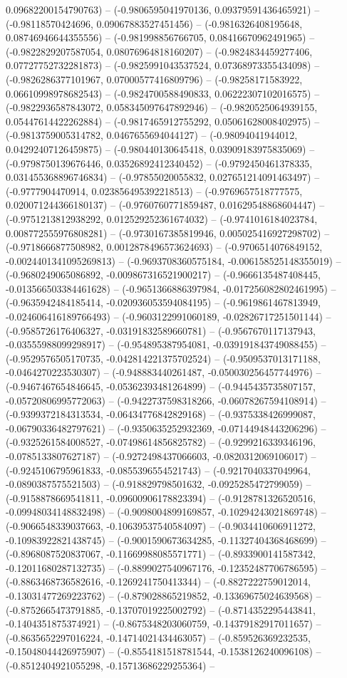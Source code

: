 0.09682200154790763) -- (-0.9806595041970136, 0.09379591436465921) -- (-0.98118570424696, 0.09067883527451456) -- (-0.9816326408195648, 0.08746946644355556) -- (-0.981998856766705, 0.08416670962491965) -- (-0.9822829207587054, 0.08076964818160207) -- (-0.9824834459277406, 0.07727752732281873) -- (-0.9825991043537524, 0.07368973355434098) -- (-0.9826286377101967, 0.07000577416809796) -- (-0.98258171583922, 0.06610998978682543) -- (-0.9824700588490833, 0.06222307102016575) -- (-0.9822936587843072, 0.058345097647892946) -- (-0.9820525064939155, 0.05447614422262884) -- (-0.9817465912755292, 0.05061628008402975) -- (-0.9813759005314782, 0.0467655694044127) -- (-0.98094041944012, 0.04292407126459875) -- (-0.980440130645418, 0.03909183975835069) -- (-0.9798750139676446, 0.03526892412340452) -- (-0.9792450461378335, 0.031455368896746834) -- (-0.97855020055832, 0.027651214091463497) -- (-0.9777904470914, 0.023856495392218513) -- (-0.9769657518777575, 0.020071244366180137) -- (-0.9760760771859487, 0.01629548868604447) -- (-0.9751213812938292, 0.012529252361674032) -- (-0.9741016184023784, 0.008772555976808281) -- (-0.9730167385819946, 0.005025416927298702) -- (-0.9718666877508982, 0.0012878496573624693) -- (-0.9706514076849152, -0.0024401341095269813) -- (-0.9693708360575184, -0.006158525148355019) -- (-0.9680249065086892, -0.009867316521900217) -- (-0.9666135487408445, -0.013566503384461628) -- (-0.9651366886397984, -0.017256082802461995) -- (-0.9635942484185414, -0.020936053594084195) -- (-0.9619861467813949, -0.024606416189766493) -- (-0.9603122991060189, -0.02826717251501144) -- (-0.9585726176406327, -0.03191832589660781) -- (-0.9567670117137943, -0.03555988099298917) -- (-0.954895387954081, -0.039191843749088455) -- (-0.9529576505170735, -0.042814221375702524) -- (-0.9509537013171188, -0.0464270223530307) -- (-0.948883440261487, -0.050030256457744976) -- (-0.9467467654846645, -0.05362393481264899) -- (-0.9445435735807157, -0.05720806995772063) -- (-0.9422737598318266, -0.06078267594108914) -- (-0.9399372184313534, -0.06434776842829168) -- (-0.9375338426999087, -0.06790336482797621) -- (-0.9350635252932369, -0.07144948443206296) -- (-0.9325261584008527, -0.07498614856825782) -- (-0.9299216339346196, -0.0785133807627187) -- (-0.9272498437066603, -0.0820312069106017) -- (-0.9245106795961833, -0.0855396554521743) -- (-0.9217040337049964, -0.0890387575521503) -- (-0.918829798501632, -0.0925285472799059) -- (-0.9158878669541811, -0.09600906178823394) -- (-0.9128781326520516, -0.09948034148832498) -- (-0.9098004899169857, -0.10294243021869748) -- (-0.9066548339037663, -0.10639537540584097) -- (-0.9034410606911272, -0.10983922821438745) -- (-0.9001590673634285, -0.11327404368468699) -- (-0.8968087520837067, -0.11669988085571771) -- (-0.8933900141587342, -0.12011680287132735) -- (-0.8899027540967176, -0.12352487706786595) -- (-0.8863468736582616, -0.1269241750413344) -- (-0.8827222759012014, -0.13031477269223762) -- (-0.879028865219852, -0.13369675024639568) -- (-0.8752665473791885, -0.13707019225002792) -- (-0.8714352295443841, -0.1404351875374921) -- (-0.8675348203060759, -0.14379182917011657) -- (-0.8635652297016224, -0.14714021434463057) -- (-0.859526369232535, -0.15048044426975907) -- (-0.8554181518781544, -0.1538126240096108) -- (-0.8512404921055298, -0.15713686229255364) -- 